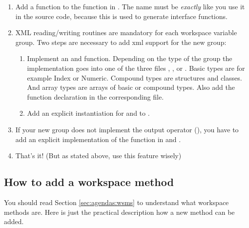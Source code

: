 \begin{enumerate}
\item Add a  function to
  the function  in .
  The name must be \emph{exactly} like you use it in the source code,
  because this is used to generate interface functions.
\item XML reading/writing routines are mandatory for each workspace variable
  group. Two steps are necessary to add xml support for the new group:
  \begin{enumerate}
  \item Implement an 
    and  function. Depending
    on the type of the group the implementation goes into one
    of the three files ,
    , or
    . Basic types are for example Index
    or Numeric. Compound types are structures and classes. And array types are
    arrays of basic or compound types. Also add the function declaration in the
    corresponding  file.
  \item Add an explicit instantiation for
     and
     to .
  \end{enumerate}
\item If your new group does not implement the output operator
  (), you have to add an explicit implementation
  of the  function in  and
  .
\item That's it! (But as stated above, use this feature wisely)
\end{enumerate}



\subsection{How to add a workspace method}

You should read Section \ref{sec:agendas:wsms} to understand what workspace
methods are. Here is just the practical description how a new
method can be added.

